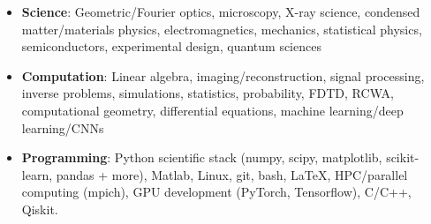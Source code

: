 \begin{itemize}
    \item \textbf{Science}: Geometric/Fourier optics, microscopy, X-ray science, condensed matter/materials physics, electromagnetics, mechanics, statistical physics, semiconductors, experimental design, quantum sciences \par
    \item \textbf{Computation}: Linear algebra, imaging/reconstruction, signal processing, inverse problems, simulations, statistics, probability, FDTD, RCWA, computational geometry, differential equations, machine learning/deep learning/CNNs \par
    \item \textbf{Programming}: Python scientific stack (numpy, scipy, matplotlib, scikit-learn, pandas + more), Matlab, Linux, git, bash, \LaTeX, HPC/parallel computing (mpich), GPU development (PyTorch, Tensorflow), C/C++, Qiskit.
\end{itemize}
